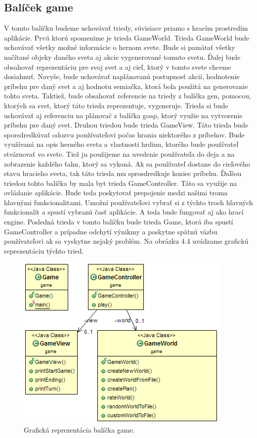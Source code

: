 \subsection{Balíček game}
V tomto balíčku budeme uchovávať triedy, súvisiace priamo s hracím prostredím aplikácie. Prvú ktorú spomenime je trieda GameWorld. Trieda GameWorld bude uchovávať všetky možné informácie o hernom svete. Bude si pamätať všetky načítané objeky daného sveta aj akcie vygenerované tomuto svetu. Ďalej bude obsahovať reprezentáciu pre svoj svet a aj cieľ, ktorý v tomto svete chceme dosiahnuť. Navyše, bude uchovávať naplánovanú postupnosť akcií, hodnotenie príbehu pre daný svet a aj hodnotu semiačka, ktorá bola použitá na generovanie tohto sveta. Taktiež, bude obsahovať referencie na triedy z balíčka gen, pomocou, ktorých sa svet, ktorý táto trieda reprezentuje, vygeneruje. Trieda si bude uchovávať aj referenciu na plánovač z balíčka goap, ktorý využie na vytvorenie príbehu pre daný svet. Druhou triedou bude trieda GameView. Táto trieda bude sporsdredkúvať odozvu používateľovi počas hrania niektorého z príbehov. Bude využívaná na opis herného sveta a vlastnosti hrdinu, ktorého bude používateľ stvárnovať vo svete. Tiež ju použijeme na uvedenie používateľa do deja a na zobrazenie každého ťahu, ktorý sa vykoná. Ak sa používateľ dostane do cieľového stavu hracieho sveta, tak táto trieda mu sprosdredkuje koniec príbehu. Ďaľšou triedou tohto balíčka by mala byt trieda GameController. Táto sa využije na ovládanie aplikácie. Bude teda poskytovať prepojenie medzi našimi troma hlavnými funkcionalitami. Umožní používateľovi vybrať si z týchto troch hlavných funkcionalít a spustí vybranú časť aplikácie. A teda bude fungovať aj ako hrací engine. Posledná trieda v tomto balíčku bude trieda Game, ktorá iba spustí GameController a prípadne odchytí výnikmy a poskytne spätnú väzbu používateľovi ak sa vyskytne nejaký problém. Na obrázku 4.4 uvádzame grafickú reprezentáciu týchto tried.
\begin{figure}[H] 
\begin{center}
\includegraphics[scale=0.9]{img/game.png}
\caption{Grafická reprezentácia balíčka game.}
\label{fig:ch44}
\end{center}
\end{figure}

